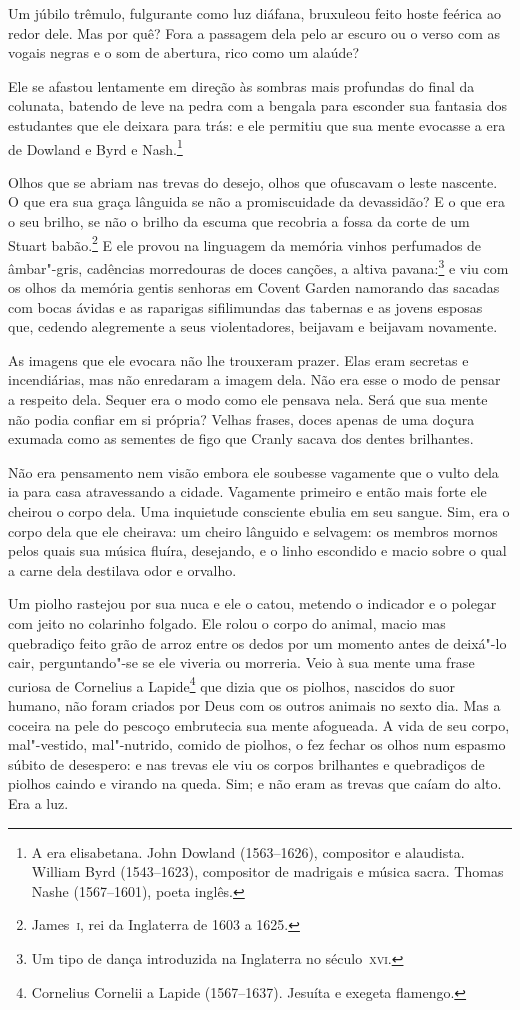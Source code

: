 Um júbilo trêmulo, fulgurante como luz diáfana, bruxuleou feito hoste
feérica ao redor dele. Mas por quê? Fora a passagem dela pelo ar
escuro ou o verso com as vogais negras e o som de abertura, rico como
um alaúde?

Ele se afastou lentamente em direção às sombras mais profundas do final
da colunata, batendo de leve na pedra com a bengala para esconder sua
fantasia dos estudantes que ele deixara para trás: e ele permitiu que
sua mente evocasse a era de Dowland e Byrd e Nash.\footnote{ A era        
elisabetana. John Dowland (1563--1626), compositor e alaudista. William Byrd (1543--1623), 
compositor de madrigais e música sacra. Thomas Nashe (1567--1601), poeta inglês.}

Olhos que se abriam nas trevas do desejo, olhos que ofuscavam o leste
nascente. O que era sua graça lânguida se não a promiscuidade da
devassidão? E o que era o seu brilho, se não o brilho da escuma que
recobria a fossa da corte de um Stuart babão.\footnote{ James~\textsc{i}, 
rei da Inglaterra de 1603 a 1625.} E ele provou na linguagem da
memória vinhos perfumados de âmbar"-gris, cadências morredouras de doces
canções, a altiva pavana:\footnote{ Um tipo de dança introduzida na
Inglaterra no século~\textsc{xvi}.} e viu com os olhos da memória gentis
senhoras em Covent Garden namorando das sacadas com bocas ávidas e
as raparigas sifilimundas das tabernas e as jovens esposas que, cedendo
alegremente a seus violentadores, beijavam e beijavam novamente.

As imagens que ele evocara não lhe trouxeram prazer. Elas eram secretas
e incendiárias, mas não enredaram a imagem dela. Não era esse o modo de
pensar a respeito dela. Sequer era o modo como ele pensava nela. Será
que sua mente não podia confiar em si própria? Velhas frases, doces
apenas de uma doçura exumada como as sementes de figo que Cranly sacava
dos dentes brilhantes.

Não era pensamento nem visão embora ele soubesse vagamente que o vulto
dela ia para casa atravessando a cidade. Vagamente primeiro e então
mais forte ele cheirou o corpo dela. Uma inquietude consciente ebulia
em seu sangue. Sim, era o corpo dela que ele cheirava: um cheiro
lânguido e selvagem: os membros mornos pelos quais sua música fluíra,
desejando, e o linho escondido e macio sobre o qual a carne dela
destilava odor e orvalho.

Um piolho rastejou por sua nuca e ele o catou, metendo o indicador e o
polegar com jeito no colarinho folgado. Ele rolou o corpo do animal,
macio mas quebradiço feito grão de arroz entre os dedos por um momento
antes de deixá"-lo cair, perguntando"-se se ele viveria ou morreria. Veio
à sua mente uma frase curiosa de Cornelius a Lapide\footnote{ Cornelius Cornelii a Lapide (1567--1637). 
Jesuíta e exegeta flamengo.} que dizia que os 
piolhos, nascidos do suor humano, não foram criados por Deus com
os outros animais no sexto dia. Mas a coceira na pele do pescoço
embrutecia sua mente afogueada. A vida de seu corpo, mal"-vestido, 
mal"-nutrido, comido de piolhos, o fez fechar os olhos num espasmo súbito de
desespero: e nas trevas ele viu os corpos brilhantes e quebradiços de
piolhos caindo e virando na queda. Sim; e não eram as trevas que caíam
do alto. Era a luz.

